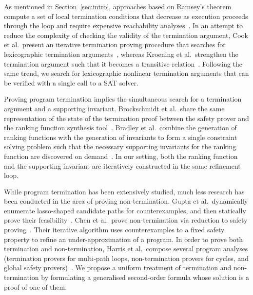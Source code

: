 \documentclass[a4paper]{llncs}
\begin{document}
As mentioned in Section~\ref{sec:intro}, approaches based on Ramsey's
theorem compute a set of local termination conditions that decrease as
execution proceeds through the loop and require expensive reachability
analyses~\cite{DBLP:conf/lpe/CodishG03,DBLP:conf/lics/PodelskiR04,DBLP:conf/pldi/CookPR06}.  In an attempt to reduce the complexity of
checking the validity of the termination argument, Cook et al.~present an
iterative termination proving procedure that searches for lexicographic
termination arguments~\cite{DBLP:conf/tacas/CookSZ13}, whereas Kroening et
al.~strengthen the termination argument such that it becomes a transitive
relation~\cite{DBLP:conf/cav/KroeningSTW10}. Following the same trend, 
we search for lexicographic nonlinear termination arguments that can be verified 
with a single call to a SAT solver. 


Proving program termination implies the simultaneous search for a
termination argument and a supporting invariant.  Brock\-schmidt et
al.~share the same representation of the state of the termination proof
between the safety prover and the ranking function synthesis
tool~\cite{DBLP:conf/cav/BrockschmidtCF13}.  Bradley et al.~combine the
generation of ranking functions with the generation of invariants to form a
single constraint solving problem such that the necessary supporting
invariants for the ranking function are discovered on
demand~\cite{DBLP:conf/cav/BradleyMS05}.  In our setting, both the ranking
function and the supporting invariant are iteratively constructed in the
same refinement loop.

While program termination has been extensively studied, much less research
has been conducted in the area of proving non-termination.  Gupta et
al.~dynamically enumerate lasso-shaped candidate paths for counterexamples,
and then statically prove their
feasibility~\cite{DBLP:conf/popl/GuptaHMRX08}.  Chen et al.~prove
non-termination via reduction to safety
proving~\cite{DBLP:conf/tacas/ChenCFNO14}.  Their iterative algorithm uses
counterexamples to a fixed safety property to refine an under-approximation
of a program.  In order to prove both termination and non-termination,
Harris et al.~compose several program analyses (termination provers for
multi-path loops, non-termination provers for cycles, and global safety
provers)~\cite{DBLP:conf/sas/HarrisLNR10}.  We propose a uniform treatment
of termination and non-termination by formulating a generalised second-order
formula whose solution is a proof of one of them.




{}
\end{document}
